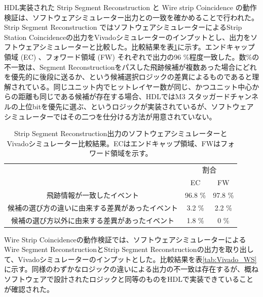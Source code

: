 HDL実装された Strip Segment Reconstruction と Wire strip Coincidence の動作検証は、ソフトウェアシミュレーター出力との一致を確かめることで行われた。Strip Segment Reconstruction ではソフトウェアシミュレーターによるStrip Station Coincidenceの出力をVivadoシミュレーターのインプットとし、出力をソフトウェアシミュレーターと比較した。比較結果を表\ref{tab:Vivado_strip}に示す。エンドキャップ領域 (EC) 、フォワード領域 (FW) それぞれで出力の96 \%程度一致した。数\%の不一致は、Segment Reconstructionをパスした飛跡候補が複数あった場合にどれを優先的に後段に送るか、という候補選択ロジックの差異によるものであると理解されている。同じユニット内でヒットレイヤー数が同じ、かつユニット中心からの距離も同じである候補が存在する場合、HDLではM3 スタッガードチャンネルの上位bitを優先に選ぶ、というロジックが実装されているが、ソフトウェアシミュレーターではその二つを仕分ける方法が用意されていない。

\begin{table}[]
    \centering
    \caption{Strip Segment Reconstruction出力のソフトウェアシミュレーターとVivadoシミュレーター比較結果。ECはエンドキャップ領域、FWはフォワード領域を示す。\cite{mt_kawamoto}}
    \label{tab:Vivado_strip}
    \begin{tabular}{|c|cc|}
    \hline
    \multirow{2}{*}{}        & \multicolumn{2}{c|}{割合}                \\ \cline{2-3} 
                             & \multicolumn{1}{c|}{EC}      & FW      \\ \hline\hline
    飛跡情報が一致したイベント            & \multicolumn{1}{c|}{96.8 \%} & 97.8 \% \\ \hline
    候補の選び方の違いに由来する差異があったイベント & \multicolumn{1}{c|}{3.2 \%}  & 2.2 \%  \\ \hline
    候補の選び方以外に由来する差異があったイベント  & \multicolumn{1}{c|}{1.8 \%}  & 0 \%    \\ \hline
    \end{tabular}
\end{table}

Wire Strip Coincidenceの動作検証では、ソフトウェアシミュレーターによるWire Segment ReconstructionとStrip Segment Reconstructionの出力を取り出して、Vivadoシミュレーターのインプットとした。比較結果を表\ref{tab:Vivado_WS}に示す。同様のわずかなロジックの違いによる出力の不一致は存在するが、概ねソフトウェアで設計されたロジックと同等のものをHDLで実装できていることが確認された。

